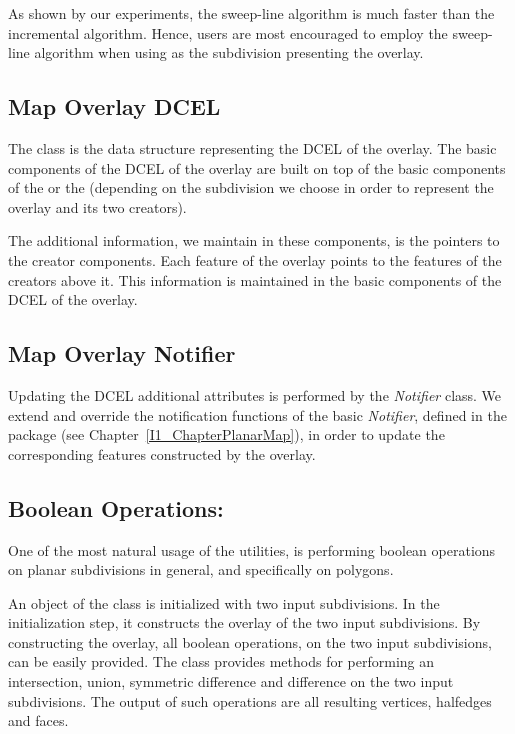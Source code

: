 \begin{ccTexOnly}
As shown by our experiments, the sweep-line algorithm is much faster than the incremental 
algorithm. Hence, users are most encouraged to employ the sweep-line algorithm 
when using  as the subdivision presenting the overlay. 

\subsection*{Map Overlay DCEL}
The 
class is the data structure representing the DCEL of the overlay. 
The basic components of the DCEL of the overlay are built 
on top of the basic components of the  or 
the  
(depending on the subdivision we choose in order to represent the overlay and its 
two creators).

The additional information, we maintain in these components, is the pointers 
to the creator components.
Each feature of the overlay points to the features of the creators above it.
This information is maintained in the basic components of the DCEL of the overlay.

\subsection*{Map Overlay Notifier}
Updating the DCEL additional attributes is performed by the {\em Notifier} class.
We extend and override the notification functions of the basic {\em Notifier}, defined 
in the  package (see Chapter~\ref{I1_ChapterPlanarMap}), 
in order to update the corresponding features constructed by the overlay.  

\subsection*{Boolean Operations:}
One of the most natural usage of the  utilities, 
is performing boolean operations on planar subdivisions in general, 
and specifically on polygons.

An object of the  class is initialized with 
two input subdivisions. In the initialization step, it constructs the overlay 
of the two input subdivisions. By constructing the overlay, all boolean operations, 
on the two input subdivisions, can be easily provided.
The   class provides methods for 
performing an intersection, union, symmetric difference and difference on the two 
input subdivisions. The output of such operations are all resulting vertices, halfedges 
and faces.


\end{ccTexOnly}
